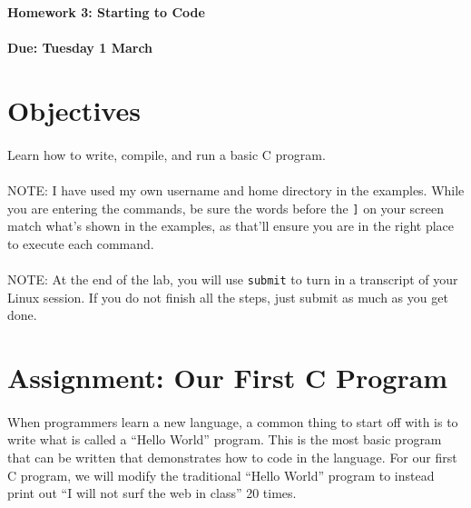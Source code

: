 \documentclass[letter,11pt]{article}
\begin{document}
\huge
\textbf{Homework 3: Starting to Code}
\normalsize
\\ ~~ \\
\textbf{Due: Tuesday 1 March}

\section*{Objectives}
\paragraph{}Learn how to write, compile, and run a basic C program.

\paragraph{}NOTE: I have used my own username and home directory in the examples. While you are entering the commands, be sure the words before the \texttt{]} on your screen match what’s shown in the examples, as that’ll ensure you are in the right place to execute each command.

\paragraph{}NOTE: At the end of the lab, you will use \texttt{submit} to turn in a transcript of your Linux session. If you do not finish all the steps, just submit as much as you get done.

\section*{Assignment: Our First C Program}
\paragraph{}When programmers learn a new language, a common thing to start off with is to write what is called a ``Hello World'' program. This is the most basic program that can be written that demonstrates how to code in the language. For our first C program, we will modify the traditional ``Hello World'' program to instead print out ``I will not surf the web in class'' 20 times.
\end{document}

